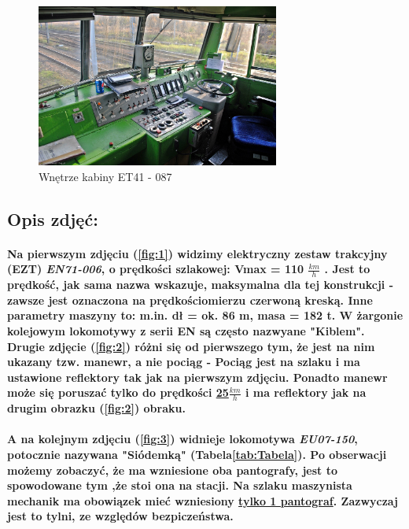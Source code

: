 \begin{center}
\begin{figure}[!ht]
\begin{center}
 \includegraphics[width=8cm]{pictures/Dominik/9554371_kabina-et41--087.jpg}
  \caption{Wnętrze kabiny ET41 - 087}
  \label{fig:4}
\end{center}
\end{figure}
\end{center}


\subsection{Opis zdjęć:}
    \paragraph{\hspace{10mm}
    Na pierwszym zdjęciu (\ref{fig:1}) widzimy elektryczny zestaw trakcyjny (EZT) \textit{EN71-006}, o prędkości szlakowej: Vmax = 110 $\frac {km}{h}$ . Jest to prędkość, jak sama nazwa wskazuje, maksymalna dla tej konstrukcji - zawsze jest oznaczona na prędkościomierzu czerwoną kreską. Inne parametry maszyny to: m.in. dł = ok. 86 m, masa = 182 t. W żargonie kolejowym lokomotywy z serii EN są często nazwyane "Kiblem". Drugie zdjęcie (\ref{fig:2}) różni się od pierwszego tym, że jest na nim ukazany tzw. manewr, a nie pociąg - Pociąg jest na szlaku i ma ustawione reflektory tak jak na pierwszym zdjęciu. Ponadto manewr może się poruszać tylko do prędkości \underline{25$\frac {km}{h}$} i ma reflektory jak na drugim obrazku (\ref{fig:2}) obraku.}
    
    \paragraph{\hspace{10mm}A na kolejnym zdjęciu (\ref{fig:3}) widnieje lokomotywa \textit{EU07-150}, potocznie nazywana "Siódemką" (Tabela\ref{tab:Tabela}). Po obserwacji możemy zobaczyć, że ma wzniesione oba pantografy, jest to spowodowane tym ,że stoi ona na stacji. Na szlaku maszynista mechanik ma obowiązek mieć wzniesiony \underline{tylko 1 pantograf}. Zazwyczaj jest to tylni, ze względów bezpiczeństwa.}

